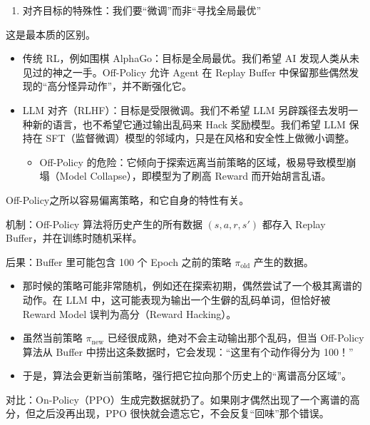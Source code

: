 \begin{enumerate}
\def\labelenumi{\arabic{enumi}.}
\setcounter{enumi}{2}
\tightlist
\item
  对齐目标的特殊性：我们要``微调''而非``寻找全局最优''
\end{enumerate}

这是最本质的区别。

\begin{itemize}
\tightlist
\item
  传统 RL，例如围棋 AlphaGo：目标是全局最优。我们希望 AI 发现人类从未见过的神之一手。Off-Policy 允许 Agent 在 Replay Buffer 中保留那些偶然发现的``高分怪异动作''，并不断强化它。
\item
  LLM 对齐（RLHF）：目标是受限微调。我们不希望 LLM 另辟蹊径去发明一种新的语言，也不希望它通过输出乱码来 Hack 奖励模型。我们希望 LLM 保持在 SFT（监督微调）模型的邻域内，只是在风格和安全性上做微小调整。

  \begin{itemize}
  \tightlist
  \item
    Off-Policy 的危险：它倾向于探索远离当前策略的区域，极易导致模型崩塌（Model Collapse），即模型为了刷高 Reward 而开始胡言乱语。
  \end{itemize}
\end{itemize}

Off-Policy之所以容易偏离策略，和它自身的特性有关。

机制：Off-Policy 算法将历史产生的所有数据 \((s,a,r,s')\) 都存入 Replay Buffer，并在训练时随机采样。

后果：Buffer 里可能包含 100 个 Epoch 之前的策略 \(\pi_{\mathrm{old}}\) 产生的数据。

\begin{itemize}
\tightlist
\item
  那时候的策略可能非常随机，例如还在探索初期，偶然尝试了一个极其离谱的动作。在 LLM 中，这可能表现为输出一个生僻的乱码单词，但恰好被 Reward Model 误判为高分（Reward Hacking）。
\item
  虽然当前策略 \(\pi_{\mathrm{new}}\) 已经很成熟，绝对不会主动输出那个乱码，但当 Off-Policy 算法从 Buffer 中捞出这条数据时，它会发现：``这里有个动作得分为 100！''
\item
  于是，算法会更新当前策略，强行把它拉向那个历史上的``离谱高分区域''。
\end{itemize}

对比：On-Policy（PPO）生成完数据就扔了。如果刚才偶然出现了一个离谱的高分，但之后没再出现，PPO 很快就会遗忘它，不会反复``回味''那个错误。

